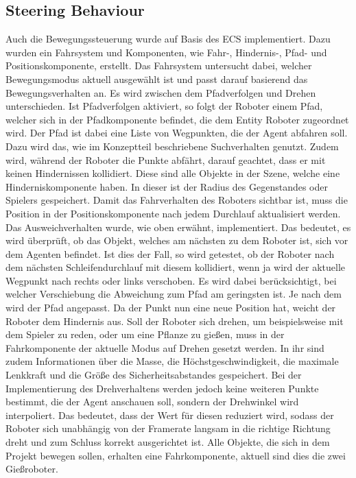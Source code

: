 \subsection{Steering Behaviour}
Auch die Bewegungssteuerung wurde auf Basis des ECS implementiert. Dazu wurden ein Fahrsystem und Komponenten, wie Fahr-, Hindernis-, Pfad- und Positionskomponente, erstellt. Das Fahrsystem untersucht dabei, welcher Bewegungsmodus aktuell ausgewählt ist und passt darauf basierend das Bewegungsverhalten an. Es wird zwischen dem Pfadverfolgen und Drehen unterschieden. Ist Pfadverfolgen aktiviert, so folgt der Roboter einem Pfad, welcher sich in der Pfadkomponente befindet, die dem Entity Roboter zugeordnet wird. Der Pfad ist dabei eine Liste von Wegpunkten, die der Agent abfahren soll. Dazu wird das, wie im Konzeptteil beschriebene Suchverhalten genutzt. Zudem wird, während der Roboter die Punkte abfährt, darauf geachtet, dass er mit keinen Hindernissen kollidiert. Diese sind alle Objekte in der Szene, welche eine Hinderniskomponente haben. In dieser ist der Radius des Gegenstandes oder Spielers gespeichert. Damit das Fahrverhalten des Roboters sichtbar ist, muss die Position in der Positionskomponente nach jedem Durchlauf aktualisiert werden. Das Ausweichverhalten wurde, wie oben erwähnt, implementiert. Das bedeutet, es wird überprüft, ob das Objekt, welches am nächsten zu dem Roboter ist, sich vor dem Agenten befindet. Ist dies der Fall, so wird getestet, ob der Roboter nach dem nächsten Schleifendurchlauf mit diesem kollidiert, wenn ja wird der aktuelle Wegpunkt nach rechts oder links verschoben. Es wird dabei berücksichtigt, bei welcher Verschiebung die Abweichung zum Pfad am geringsten ist. Je nach dem wird der Pfad angepasst. Da der Punkt nun eine neue Position hat, weicht der Roboter dem Hindernis aus.
Soll der Roboter sich drehen, um beispielsweise mit dem Spieler zu reden, oder um eine Pflanze zu gießen, muss in der Fahrkomponente der aktuelle Modus auf Drehen gesetzt werden. In ihr sind zudem Informationen über die Masse, die Höchstgeschwindigkeit, die maximale Lenkkraft und die Größe des Sicherheitsabstandes gespeichert. Bei der Implementierung des Drehverhaltens werden jedoch keine weiteren Punkte bestimmt, die der Agent anschauen soll, sondern der Drehwinkel wird interpoliert. Das bedeutet, dass der Wert für diesen reduziert wird, sodass der Roboter sich unabhängig von der Framerate langsam in die richtige Richtung dreht und zum Schluss korrekt ausgerichtet ist. Alle Objekte, die sich in dem Projekt bewegen sollen, erhalten eine Fahrkomponente, aktuell sind dies die zwei Gießroboter.
